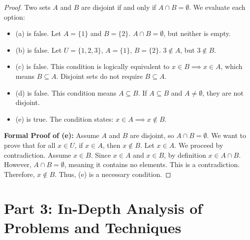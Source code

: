 \documentclass[11pt]{article}
\theoremstyle{definition}
\theoremstyle{remark}
\begin{document}
\begin{proof}
Two sets $A$ and $B$ are disjoint if and only if $A \cap B = \emptyset$. We evaluate each option:
\begin{itemize}
    \item (a) is false. Let $A = \{1\}$ and $B = \{2\}$. $A \cap B = \emptyset$, but neither is empty.
    \item (b) is false. Let $U = \{1, 2, 3\}$, $A = \{1\}$, $B = \{2\}$. $3 \notin A$, but $3 \notin B$.
    \item (c) is false. This condition is logically equivalent to $x \in B \implies x \in A$, which means $B \subseteq A$. Disjoint sets do not require $B \subseteq A$.
    \item (d) is false. This condition means $A \subseteq B$. If $A \subseteq B$ and $A \neq \emptyset$, they are not disjoint.
    \item (e) is true. The condition states: $x \in A \implies x \notin B$. 
\end{itemize}
\textbf{Formal Proof of (e):} Assume $A$ and $B$ are disjoint, so $A \cap B = \emptyset$. We want to prove that for all $x \in U$, if $x \in A$, then $x \notin B$. 
Let $x \in A$. We proceed by contradiction. Assume $x \in B$. 
Since $x \in A$ and $x \in B$, by definition $x \in A \cap B$. 
However, $A \cap B = \emptyset$, meaning it contains no elements. This is a contradiction. 
Therefore, $x \notin B$. Thus, (e) is a necessary condition.
\end{proof}

\newpage
\section{Part 3: In-Depth Analysis of Problems and Techniques}
\end{document}
